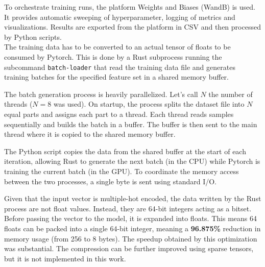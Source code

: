 To orchestrate training runs, the platform Weights and Biases (WandB) is used. It provides automatic sweeping of hyperparameter, logging of metrics and visualizations. Results are exported from the platform in CSV and then processed by Python scripts. \\

The training data has to be converted to an actual tensor of floats to be consumed by Pytorch. This is done by a Rust subprocess running the subcommand \texttt{batch-loader} that read the training data file and generates training batches for the specified feature set in a shared memory buffer.

The batch generation process is heavily parallelized. Let's call $N$ the number of threads ($N=8$ was used). On startup, the process splits the dataset file into $N$ equal parts and assigns each part to a thread. Each thread reads samples sequentially and builds the batch in a buffer. The buffer is then sent to the main thread where it is copied to the shared memory buffer.

The Python script copies the data from the shared buffer at the start of each iteration, allowing Rust to generate the next batch (in the CPU) while Pytorch is training the current batch (in the GPU). To coordinate the memory access between the two processes, a single byte is sent using standard I/O.

Given that the input vector is multiple-hot encoded, the data written by the Rust process are not float values. Instead, they are 64-bit integers acting as a bitset. Before passing the vector to the model, it is expanded into floats. This means 64 floats can be packed into a single 64-bit integer, meaning a \textbf{96.875\%} reduction in memory usage (from 256 to 8 bytes). The speedup obtained by this optimization was substantial. The compression can be further improved using sparse tensors, but it is not implemented in this work. \\



